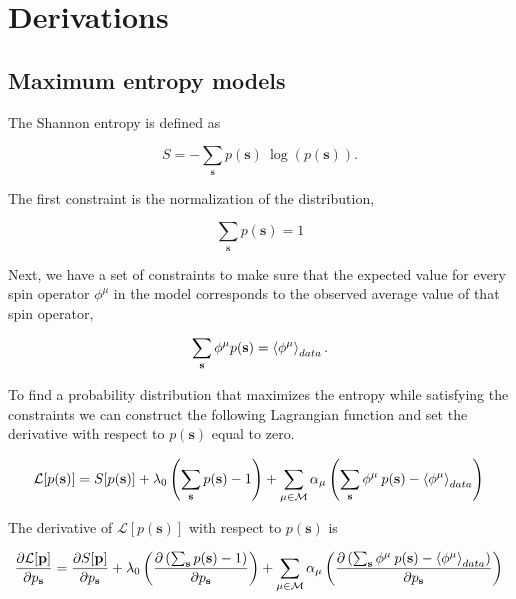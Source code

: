 \appendix

\newpage

\section{Derivations}

\subsection{Maximum entropy models}\label{sec:max_entropy}

The Shannon entropy is defined as 

\begin{equation}
    S = - \sum_{\mathbf{s}} p(\mathbf{s}) \: \log(p(\mathbf{s})).
\end{equation}

\noindent
The first constraint is the normalization of the distribution,

\begin{equation*}
    \sum_{\mathbf{s}} p(\mathbf{s}) = 1
\end{equation*}

\noindent
Next, we have a set of constraints to make sure that the expected value for every spin operator $\phi^\mu$ in the model corresponds to the observed average value of that spin operator,

\begin{equation*}
    \sum_{\mathbf{s}} \phi^\mu p(\mathbf{s}) = \expval{\phi^\mu}_{data}. \label{eq:constraints}
\end{equation*}

\noindent
To find a probability distribution that maximizes the entropy while satisfying the constraints we can construct the following Lagrangian function and set the derivative with respect to $p(\mathbf{s})$ equal to zero.

\begin{equation}
    \mathcal{L}[p(\mathbf{s})] = S[p(\mathbf{s})] + \lambda_0 \left( \sum_{\mathbf{s}} p(\mathbf{s}) - 1 \right) + \sum_{\mu \in \mathcal{M}} \alpha_\mu \left( \sum_{\mathbf{s}} \phi^\mu \: p(\mathbf{s}) - \expval{\phi^\mu}_{data} \right)\\
\end{equation}

\noindent
The derivative of $\mathcal{L}[p(\mathbf{s})]$ with respect to $p(\mathbf{s})$ is

\begin{equation*}
    \frac{\partial \mathcal{L}[\mathbf{p}]}{\partial p_\mathbf{s}} = \frac{\partial S[\mathbf{p}]}{\partial p_\mathbf{s}} + \lambda_0 \left( \frac{\partial \left( \sum_{\mathbf{s}} p(\mathbf{s}) - 1 \right)}{\partial p_\mathbf{s}}\right) + \sum_{\mu \in \mathcal{M}} \alpha_\mu \left( \frac{\partial \left( \sum_{\mathbf{s}} \phi^\mu \: p(\mathbf{s}) - \expval{\phi^\mu}_{data} \right)}{\partial p_\mathbf{s}} \right) \\
\end{equation*}

